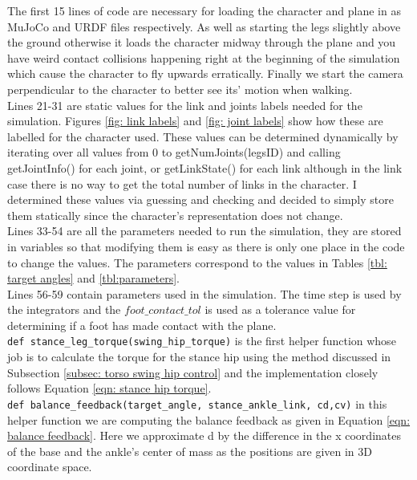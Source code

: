 \documentclass[12pt, a4paper]{article}
\begin{document}
The first 15 lines of code are necessary for loading the character and plane in as MuJoCo and URDF files respectively. As well as starting the legs slightly above the ground otherwise it loads the character midway through the plane and you have weird contact collisions happening right at the beginning of the simulation which cause the character to fly upwards erratically. Finally we start the camera perpendicular to the character to better see its' motion when walking.\\

Lines 21-31 are static values for the link and joints labels needed for the simulation. Figures \ref{fig: link labels} and \ref{fig: joint labels} show how these are labelled for the character used. These values can be determined dynamically by iterating over all values from 0 to getNumJoints(legsID) and calling getJointInfo() for each joint, or getLinkState() for each link although in the link case there is no way to get the total number of links in the character. I determined these values via guessing and checking and decided to simply store them statically since the character's representation does not change. \\

Lines 33-54 are all the parameters needed to run the simulation, they are stored in variables so that modifying them is easy as there is only one place in the code to change the values. The parameters correspond to the values in Tables \ref{tbl: target angles} and \ref{tbl:parameters}.\\

Lines 56-59 contain parameters used in the simulation. The time step is used by the integrators and the $foot\_contact\_tol$ is used as a tolerance value for determining if a foot has made contact with the plane.\\

\verb;def stance_leg_torque(swing_hip_torque); is the first helper function whose job is to calculate the torque for the stance hip using the method discussed in Subsection \ref{subsec: torso swing hip control} and the implementation closely follows Equation \ref{eqn: stance hip torque}. \\

\verb;def balance_feedback(target_angle, stance_ankle_link, cd,cv); in this helper function we are computing the balance feedback as given in Equation \ref{eqn: balance feedback}. Here we approximate d by the difference in the x coordinates of the base and the ankle's center of mass as the positions are given in 3D coordinate space. \\
\end{document}

